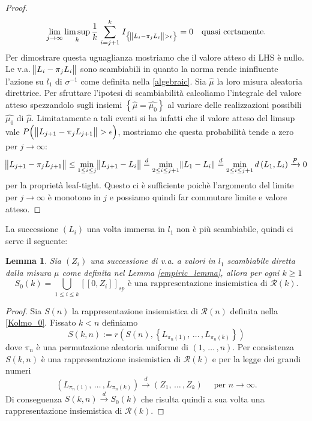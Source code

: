 \documentclass[11pt, twoside]{report}
\newcommand{\Rr}{\mathscr{R}}
\theoremstyle{definition}
\theoremstyle{plain}
\newtheorem{lemma}[teo]{Lemma}
\theoremstyle{remark}
\numberwithin{equation}{chapter}
\begin{document}
\begin{proof}
$$ \lim\limits_{j\to \infty} \limsup\limits_k \frac{1}{k} \stackrel{k}{\sum\limits_{i=j+1}} I_{\left\{\norm{L_i-\pi_j L_i}>\epsilon \right\}} = 0 \quad \text{quasi certamente.}$$
Per dimostrare questa uguaglianza mostriamo che il valore atteso di LHS è nullo. Le v.a. $\norm{L_i-\pi_j L_i}$ sono scambiabili in quanto la norma rende ininfluente l'azione su $l_1$ di $\sigma^{-1}$ come definita nella \eqref{algebraic}. Sia $\hat{\mu}$ la loro misura aleatoria direttrice. Per sfruttare l'ipotesi di scambiabilità calcoliamo l'integrale del valore atteso spezzandolo sugli insiemi $\left\{ \hat{\mu}= \hat{\mu_0}\right\}$ al variare delle realizzazioni possibili $\hat{\mu_0}$ di $\hat{\mu}$. Limitatamente a tali eventi si ha infatti che il valore atteso del limsup vale $P\Big(\norm{L_{j+1}-\pi_j L_{j+1}}>\epsilon\Big)$, mostriamo che questa probabilità tende a zero per $j \to \infty$:
\begin{gather}
\norm{L_{j+1}-\pi_j L_{j+1}}\leq \min\limits_{1\leq i \leq j} \norm{L_{j+1}-L_i} \stackrel{d}{=} \min\limits_{2\leq i \leq j+1} \norm{L_1-L_i} \stackrel{d}{=}\min\limits_{2\leq i \leq j+1} d\left(L_1, L_i\right)\xrightarrow{P} 0 \nonumber
\end{gather}
per la proprietà leaf-tight. Questo ci è sufficiente poichè l'argomento del limite per $j\longrightarrow \infty$ è monotono in $j$ e possiamo quindi far commutare limite e valore atteso.
\end{proof}

La successione $\left(L_i\right)$ una volta immersa in $l_1$ non è più scambiabile, quindi ci serve il seguente:

\begin{lemma} \label{s0_lemma}
Sia $(Z_i)$ una successione di v.a. a valori in $l_1$ scambiabile diretta dalla misura $\mu$ come definita nel Lemma \ref{empiric_lemma}, allora per ogni $k\geq 1$
\begin{equation}
S_0(k)=\bigcup\limits_{1\leq i \leq k} [[0,Z_i]]_{sp} \text{ è una rappresentazione insiemistica di } \Rr(k).
\end{equation}
\end{lemma}

\begin{proof}
Sia $S(n)$ la rappresentazione insiemistica di $\Rr(n)$ definita nella \eqref{Kolmo_0}. Fissato $k<n$ definiamo 
$$ S(k,n):=r\left( S(n), \left\{L_{\pi_n(1)}, \, \dots \, , L_{\pi_n(k)}\right\} \right)$$
dove $\pi_n$ è una permutazione aleatoria uniforme di $\left(1, \, \dots \, ,n\right)$. Per consistenza $S(k,n)$ è una rappresentazione insiemistica di $\Rr(k)$ e per la legge dei grandi numeri 
$$\left(L_{\pi_n(1)}, \, \dots \, , L_{\pi_n(k)}\right)  \xrightarrow{d} \left(Z_1, \, \dots \, ,Z_k\right)\quad \text{ per } n\rightarrow\infty.$$
Di conseguenza $S(k,n)\xrightarrow{d} S_0(k)$ che risulta quindi a sua volta una rappresentazione insiemistica di $\Rr(k)$.
\end{proof}
\end{document}
